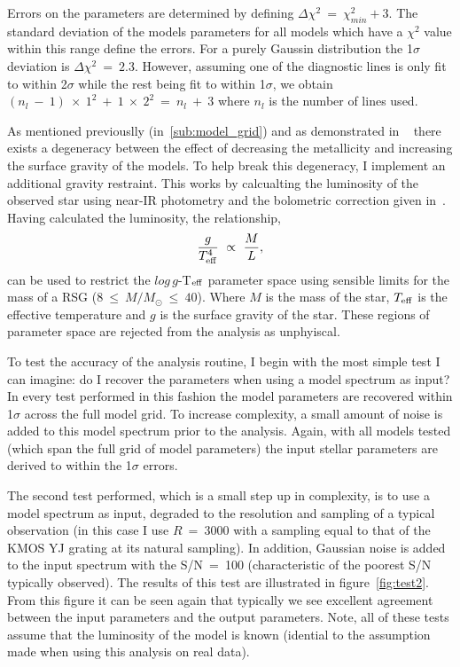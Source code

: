 Errors on the parameters are determined by defining
$\Delta\chi^{2}~=~\chi^{2}_{min} + 3$.
The standard deviation of the models parameters for all models which have a
$\chi^{2}$ value within this range define the errors.
For a purely Gaussin distribution the 1$\sigma$ deviation is $\Delta\chi^{2}~=~2.3$.
However, assuming one of the diagnostic lines is only fit to within 2$\sigma$ while the rest being fit to within 1$\sigma$, we obtain $(n_{l}~-~1)~\times~1^{2}~+~1~\times~2^{2}~=~n_{l}~+~3$
where $n_{l}$ is the number of lines used.

As mentioned previouslly (in~\ref{sub:model_grid}) and as demonstrated in
~\cite{2015ApJ...806...21D} there exists a degeneracy between the effect of decreasing the metallicity and increasing the surface gravity of the models.
To help break this degeneracy, I implement an additional gravity restraint.
This works by calcualting the luminosity of the observed star using near-IR photometry and the bolometric correction given in~\cite{Davies13b}.
Having calculated the luminosity, the relationship,
\begin{equation}
    \frac{g}{T^{4}_{\rm eff}}~\propto~\frac{M}{L},
\end{equation}
can be used to restrict the $log\,g$-T$_{\rm eff}$
parameter space using sensible limits for the mass of a RSG
($8~\leq~M/M_{\odot}~\leq~40$).
Where $M$ is the mass of the star,
$T_{\rm eff}$ is the effective temperature and $g$ is the surface gravity of the star.
These regions of parameter space are rejected from the analysis as unphyiscal.

To test the accuracy of the analysis routine, I begin with the most simple test I can imagine:
do I recover the parameters when using a model spectrum as input?
In every test performed in this fashion the model parameters are recovered within 1$\sigma$ across the full model grid.
To increase complexity, a small amount of noise is added to this model spectrum prior to the analysis.
Again, with all models tested (which span the full grid of model parameters) the input stellar parameters are derived to within the 1$\sigma$ errors.

The second test performed, which is a small step up in complexity, is to use a model spectrum as input, degraded to the resolution and sampling of a typical observation (in this case I use $R~=~3000$ with a sampling equal to that of the KMOS YJ grating at its natural sampling).
In addition, Gaussian noise is added to the input spectrum with the S/N~=~100
(characteristic of the poorest S/N typically observed).
The results of this test are illustrated in figure~\ref{fig:test2}.
From this figure it can be seen again that typically we see excellent agreement between the input parameters and the output parameters.
Note, all of these tests assume that the luminosity of the model is known
(idential to the assumption made when using this analysis on real data).

